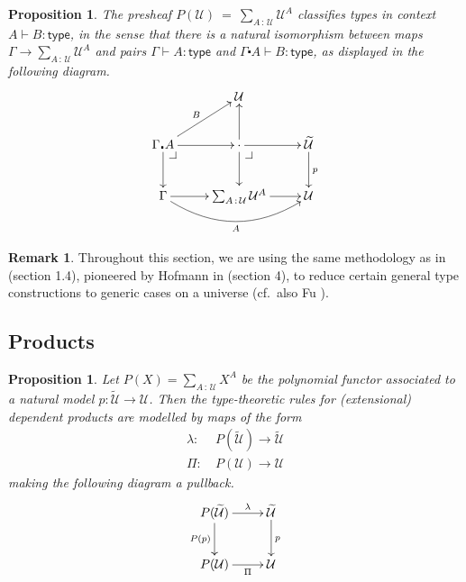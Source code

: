 \documentclass[12pt]{article}
\makeatletter
\newcommand{\pbcorner}[1][dr]{\save*!/#1-1.2pc/#1:(-1,1)@^{|-}\restore}
\newcommand{\G}{\ensuremath{\Gamma}}
\newcommand{\type}{\mathsf{type}}
\newcommand{\types}[2]{#1 \vdash #2:\type}
\newcommand{\term}[2]{#1\,:\,#2}
\newcommand{\ext}[2]{{#1\!\centerdot\! #2}}
\newcommand{\U}{\ensuremath{\mathcal{U}}}
\newcommand{\UU}{\ensuremath{\widetilde{\mathcal{U}}}}
\newtheorem{proposition}[theorem]{Proposition}
\theoremstyle{definition}
\newtheorem{remark}[theorem]{Remark}
\makeatother
\begin{document}
\begin{proposition}\label{prop:polyclasstypes}
The presheaf $P(\U)\ =\ \sum_{\term{A}{\U}}\U^{A}$ classifies types in context $\types{A}{B}$, in the sense that there is a natural isomorphism between maps $\G \to \sum_{\term{A}{\U}}\U^{A}$ and pairs $\types{\G}{A}$ and $\types{\ext{\G}{A}}{B}$, as displayed in the following diagram.
\begin{equation}\label{diag:polyclasstypes}
\xymatrix{
 & \U & \\
 \ext{\G}{A} \ar[r] \ar[ur]^{B} \ar[d] \pbcorner & \cdot \ar[u] \ar[d] \ar[r] \pbcorner &  \UU \ar[d]^{p}\\
\G \ar[r] \ar@/{}_{20pt}/[rr]_{A} & \sum_{\term{A}{\U}}\U^{A} \ar[r]   & \U
}
\end{equation}
\end{proposition}

\begin{remark}
Throughout this section, we are using the same methodology as in \cite{KLV}(section 1.4), pioneered by Hofmann in \cite{Hofmann}(section 4), to reduce certain general type constructions to generic cases on a universe (cf.~also Fu \cite{Fu}).
\end{remark}
\subsection{Products}

\begin{proposition}\label{prop:prod} 
Let $P(X) =\sum_{\term{A}{\U}}X^{A}$ be the polynomial functor associated to a natural model $p : \UU \to \U$.
Then the type-theoretic rules for (extensional) dependent products are modelled by maps of the form
\begin{align}
\lambda :&\ P(\UU)\to \UU \label{prop:prod1}\\
\Pi :&\ P(\U) \to \U \label{prop:prod2}
\end{align}
making the following diagram a pullback. 
%
\begin{equation}\label{diag:prod}
\xymatrix{
P(\UU)  \ar[d]_{P(p)} \ar[r]^-{\lambda} &  \UU \ar[d]^{p}\\
P(\U) \ar[r]_-{\Pi} & \U }
\end{equation}
%
\end{proposition}
\end{document}
